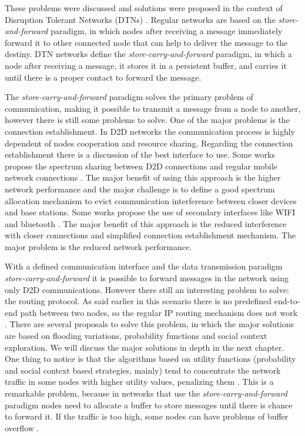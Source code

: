 These problems were discussed and solutions were proposed in the context of Disruption Tolerant Networks (DTNs) \cite{fall2003delay}.
Regular networks are based on the \textit{store-and-forward} paradigm, in which nodes after receiving a message
immediately forward it to other connected node that can help to deliver the message to the destiny. DTN networks define the \textit{store-carry-and-forward} paradigm,
in which a node after receiving a message, it stores it in a persistent buffer, and carries it until there is a proper contact to forward the message.

The \textit{store-carry-and-forward} paradigm solves the primary problem of communication, making it possible to transmit a message from a node to another, however there is still some problems to solve.
One of the major problems is the connection establishment. In D2D networks the communication process is highly dependent of nodes cooperation and resource sharing. Regarding the connection establishment
there is a discussion of the best interface to use. Some works propose the spectrum sharing between D2D connections and regular mobile network connections \cite{lin2014spectrum}. The major benefit of using this
approach is the higher network performance and the major challenge is to define a good spectrum allocation mechanism to evict communication interference between closer devices and base stations.
Some works propose the use of secondary interfaces like WIFI and bluetooth \cite{mao2015contact}. The major benefit of this approach is the reduced interference with closer connections and
simplified connection establishment mechanism. The major problem is the reduced network performance.

With a defined communication interface and the data transmission paradigm \textit{store-carry-and-forward} it is possible to forward messages in the network using only D2D communications.
However there still an interesting problem to solve: the routing protocol. As said earlier in this scenario there is no predefined end-to-end path between two nodes, so the regular IP routing mechanism does not work \cite{misra2016opportunistic}.
There are several proposals to solve this problem, in which the major solutions are based on flooding variations, probability functions and social context exploration.
We will discuss the major solutions in depth in the next chapter. One thing to notice is that the algorithms based on utility functions (probability and social context based strategies, mainly)
tend to concentrate the network traffic in some nodes with higher utility values, penalizing them \cite{chilipirea2013energy}. This is a remarkable problem, because
in networks that use the \textit{store-carry-and-forward} paradigm nodes need to allocate a buffer to store messages until there is chance to forward it. If the traffic is too high, some nodes can have problems of
buffer overflow \cite{silva2015survey}.

